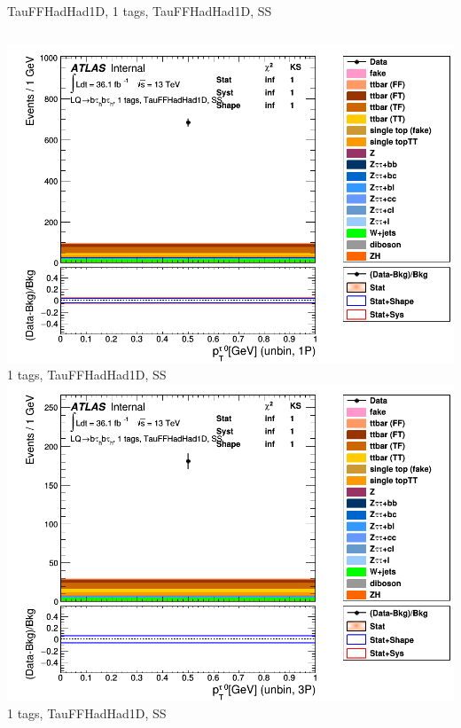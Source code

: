 \begin{frame}{TauFFHadHad1D, 1 tags, TauFFHadHad1D, SS}
\begin{columns}[c]
    \centering\includegraphics[width=\textwidth]{C_1tag2pjet_0ptv_SS_UnbinLeadTau1P}\\
    1 tags, TauFFHadHad1D, SS
    \centering\includegraphics[width=\textwidth]{C_1tag2pjet_0ptv_SS_UnbinLeadTau3P}\\
    1 tags, TauFFHadHad1D, SS
  \end{columns}
\end{frame}

